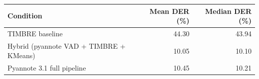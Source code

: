 \begin{tabular}{lrr}
\toprule
Condition & Mean DER (\%) & Median DER (\%) \\
\midrule
TIMBRE baseline & 44.30 & 43.94 \\
Hybrid (pyannote VAD + TIMBRE + KMeans) & 10.05 & 10.10 \\
Pyannote 3.1 full pipeline & 10.45 & 10.21 \\
\bottomrule
\end{tabular}

